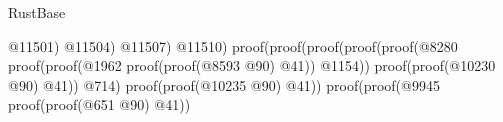 \begin{lexlean}{RustBase}
\begin{coremodule}
                                                                                                                @11501)
                                                                                                              @11504)
                                                                                                            @11507)
                                                                                                          @11510)
                                                                                                        proof(proof(proof(proof(proof(@8280
                                                                                                                    proof(proof(@1962
                                                                                                                          proof(proof(@8593
                                                                                                                                @90)
                                                                                                                              @41))
                                                                                                                        @1154))
                                                                                                                  proof(proof(@10230
                                                                                                                        @90)
                                                                                                                      @41))
                                                                                                                @714)
                                                                                                              proof(proof(@10235
                                                                                                                    @90)
                                                                                                                  @41))
                                                                                                            proof(proof(@9945
                                                                                                                  proof(proof(@651
                                                                                                                        @90)
                                                                                                                      @41))

\end{coremodule}
\end{lexlean}
